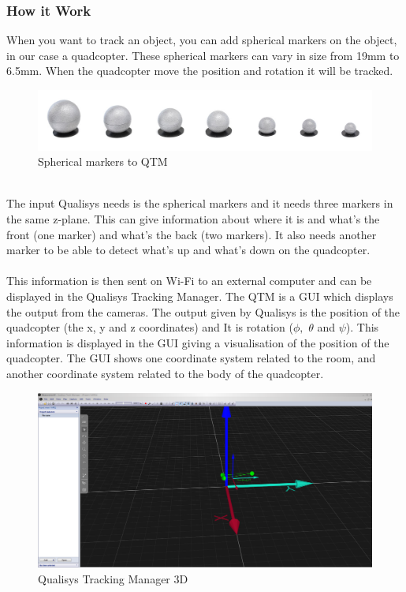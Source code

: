 \subsubsection{How it Work}
When you want to track an object, you can add spherical markers on the object, in our case a quadcopter. These spherical markers can vary in size from 19mm to 6.5mm. When the quadcopter move the position and rotation it will be tracked. \\
\begin{figure}[h]
          \centering
            \includegraphics[scale = 0.35]{VAPIQ-PICTURES/sphere.png}
                \caption{Spherical markers to QTM}
                \label{sphere}
            \label{dir}
\end{figure}
\\
The input Qualisys needs is the spherical markers and it needs three markers in the same z-plane. This can give information about where it is and what’s the front (one marker) and what’s the back (two markers). It also needs another marker to be able to detect what’s up and what’s down on the quadcopter. 
\\\\
This information is then sent on Wi-Fi to an external computer and can be displayed in the Qualisys Tracking Manager. The QTM is a GUI which displays the output from the cameras. The output given by Qualisys is the position of the quadcopter (the x, y and z coordinates) and It is rotation ($ \phi,$ $ \theta $ and $ \psi $). This information is displayed in the GUI giving a visualisation of the position of the quadcopter. The GUI shows one coordinate system related to the room, and another coordinate system related to the body of the quadcopter.
\begin{figure}[ht]
          \centering
            \includegraphics[scale = 0.25]{VAPIQ-PICTURES/qtm.png}
                \caption{Qualisys Tracking Manager 3D}
                \label{qtm3d}
            \label{dir}
\end{figure}
